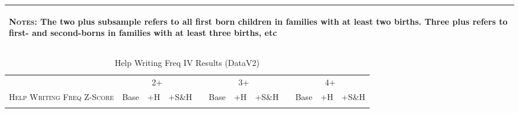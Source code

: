 \begin{landscape}
\begin{table}[htpb!]
\begin{center}
\begin{tabular}{lcccp{2mm}cccp{2mm}ccc}
\midrule\multicolumn{12}{p{19.2cm}}{\begin{footnotesize}\textsc{Notes:} The two plus subsample refers to all first born children in families with at least two births.  Three plus refers to first- and second-borns in families with at least three births, etc\end{footnotesize}} \\ \bottomrule 
\end{tabular}\end{center}\end{table}\end{landscape}\begin{landscape}\begin{table}[htpb!]\caption{Help Writing Freq IV Results (DataV2)}
\label{TWINtab:IVAll}
\begin{center}\begin{tabular}{lcccp{2mm}cccp{2mm}ccc}
\toprule \toprule 
&\multicolumn{3}{c}{2+}&&\multicolumn{3}{c}{3+}&&\multicolumn{3}{c}{4+}\\ \cmidrule(r){2-4} \cmidrule(r){6-8} \cmidrule(r){10-12} 
\textsc{Help Writing Freq Z-Score}&Base&+H&+S\&H&&Base&+H&+S\&H&&Base&+H&+S\&H\\ \midrule 
\begin{footnotesize}\end{footnotesize}& 
\begin{footnotesize}\end{footnotesize}& 
\begin{footnotesize}\end{footnotesize}& 
\begin{footnotesize}\end{footnotesize}& 
\begin{footnotesize}\end{footnotesize}& 
\begin{footnotesize}\end{footnotesize}& 
\begin{footnotesize}\end{footnotesize}& 
\begin{footnotesize}\end{footnotesize}& 
\begin{footnotesize}\end{footnotesize}& 
\begin{footnotesize}\end{footnotesize}& 
\begin{footnotesize}\end{footnotesize}& 
\begin{footnotesize}\end{footnotesize}\\ 

\end{tabular}
\end{center}
\end{table}
\end{landscape}
